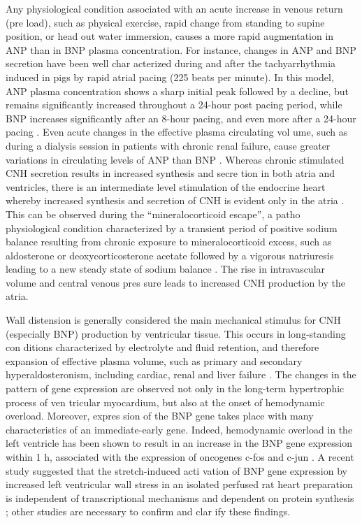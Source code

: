 \documentclass[14pt,a4paper,onecolumn]{extarticle}
\begin{document}
Any physiological condition associated with an acute increase in venous return (pre load), such as physical exercise, rapid change from standing to supine position, or head out water immersion, causes a more rapid augmentation in ANP than in BNP plasma concentration. For instance, changes in ANP and BNP secretion have been well char acterized during and after the tachyarrhythmia induced in pigs by rapid atrial pacing (225 beats per minute). In this model, ANP plasma concentration shows a sharp initial peak followed by a decline, but remains significantly increased throughout a 24-hour post pacing period, while BNP increases significantly after an 8-hour pacing, and even more after a 24-hour pacing \citep{29}. Even acute changes in the effective plasma circulating vol ume, such as during a dialysis session in patients with chronic renal failure, cause greater variations in circulating levels of ANP than BNP \citep{30}.  Whereas chronic stimulated CNH secretion results in increased synthesis and secre tion in both atria and ventricles, there is an intermediate level stimulation of the endocrine heart whereby increased synthesis and secretion of CNH is evident only in the atria \citep{12} \citep{13}. This can be observed during the “mineralocorticoid escape”, a patho physiological condition characterized by a transient period of positive sodium balance resulting from chronic exposure to mineralocorticoid excess, such as aldosterone or deoxycorticosterone acetate followed by a vigorous natriuresis leading to a new steady state of sodium balance \citep{12} \citep{13}. The rise in intravascular volume and central venous pres sure leads to increased CNH production by the atria.

Wall distension is generally considered the main mechanical stimulus for CNH (especially BNP) production by ventricular tissue. This occurs in long-standing con ditions characterized by electrolyte and fluid retention, and therefore expansion of effective plasma volume, such as primary \citep{31} and secondary hyperaldosteronism, including cardiac, renal and liver failure \citep{12} \citep{13} \citep{18} \citep{30}. The changes in the pattern of gene expression are observed not only in the long-term hypertrophic process of ven tricular myocardium, but also at the onset of hemodynamic overload. Moreover, expres sion of the BNP gene takes place with many characteristics of an immediate-early gene. Indeed, hemodynamic overload in the left ventricle has been shown to result in an increase in the BNP gene expression within 1 h, associated with the expression of oncogenes c-fos and c-jun \citep{32}. A recent study suggested that the stretch-induced acti vation of BNP gene expression by increased left ventricular wall stress in an isolated perfused rat heart preparation is independent of transcriptional mechanisms and dependent on protein synthesis \citep{32}; other studies are necessary to confirm and clar ify these findings.
\end{document}
